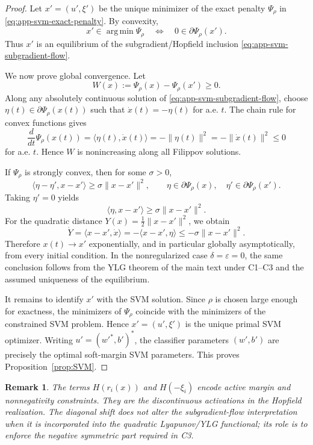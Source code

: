 \documentclass[journal]{IEEEtran}
\theoremstyle{myplain}
\newtheorem{remark}{Remark}
\begin{document}
\begin{proof}
Let \(x'=(u',\xi')\) be the unique minimizer of the exact penalty
\(\Psi_\rho\) in \eqref{eq:app-svm-exact-penalty}. By convexity,
\[
  x'\in\operatorname*{arg\,min}\Psi_\rho
  \quad\Longleftrightarrow\quad
  0\in \partial\Psi_\rho(x').
\]
Thus \(x'\) is an equilibrium of the subgradient/Hopfield inclusion
\eqref{eq:app-svm-subgradient-flow}.

We now prove global convergence. Let
\[
  W(x):=\Psi_\rho(x)-\Psi_\rho(x')\ge 0 .
\]
Along any absolutely continuous solution of
\eqref{eq:app-svm-subgradient-flow}, choose
\(\eta(t)\in\partial\Psi_\rho(x(t))\) such that
\(\dot x(t)=-\eta(t)\) for a.e. \(t\). The chain rule for convex functions
gives
\[
  \frac{d}{dt}\Psi_\rho(x(t))
  =
  \langle \eta(t),\dot x(t)\rangle
  =
  -\|\eta(t)\|^2
  =
  -\|\dot x(t)\|^2
  \le 0
\]
for a.e. \(t\). Hence \(W\) is nonincreasing along all Filippov solutions.

If \(\Psi_\rho\) is strongly convex, then for some \(\sigma>0\),
\[
  \langle \eta-\eta',x-x'\rangle\ge \sigma\|x-x'\|^2,
  \qquad
  \eta\in\partial\Psi_\rho(x),\quad
  \eta'\in\partial\Psi_\rho(x').
\]
Taking \(\eta'=0\) yields
\[
  \langle \eta,x-x'\rangle\ge \sigma\|x-x'\|^2 .
\]
For the quadratic distance \(Y(x)=\frac12\|x-x'\|^2\), we obtain
\[
  \dot Y
  =
  \langle x-x',\dot x\rangle
  =
  -\langle x-x',\eta\rangle
  \le
  -\sigma\|x-x'\|^2 .
\]
Therefore \(x(t)\to x'\) exponentially, and in particular globally
asymptotically, from every initial condition. In the nonregularized case
\(\delta=\varepsilon=0\), the same conclusion follows from the YLG theorem of
the main text under C1--C3 and the assumed uniqueness of the equilibrium.

It remains to identify \(x'\) with the SVM solution. Since \(\rho\) is chosen
large enough for exactness, the minimizers of \(\Psi_\rho\) coincide with the
minimizers of the constrained SVM problem. Hence \(x'=(u',\xi')\) is the unique
primal SVM optimizer. Writing \(u'=(w'^*,b')^*\), the classifier parameters
\((w',b')\) are precisely the optimal soft-margin SVM parameters. This proves
Proposition~\ref{prop:SVM}.
\end{proof}

\begin{remark}
The terms \(H(r_i(x))\) and \(H(-\xi_i)\) encode active margin and nonnegativity
constraints. They are the discontinuous activations in the Hopfield
realization. The diagonal shift does not alter the subgradient-flow
interpretation when it is incorporated into the quadratic Lyapunov/YLG
functional; its role is to enforce the negative symmetric part required in C3.
\end{remark}
\end{document}
